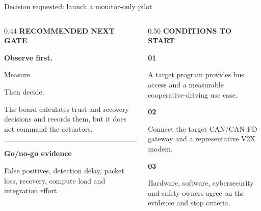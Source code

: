 \documentclass[aspectratio=169,11pt,xcolor=table]{beamer}
\newcommand{\eyebrow}[1]{%
  {\color{BrandCyan}\fontsize{7.5}{9}\selectfont\bfseries\MakeUppercase{#1}}\par\vspace{0.13cm}%
}
\newcommand{\stepnumber}[1]{%
  {\color{BrandCyan}\fontsize{17.5}{19.5}\selectfont\bfseries #1}%
}
\begin{document}
\begin{frame}{Decision requested: launch a monitor-only pilot}
  \begin{columns}[T,onlytextwidth]
    \begin{column}{0.44\textwidth}
      \eyebrow{Recommended next gate}
      {\color{BrandBlue}\fontsize{20}{22.5}\selectfont\bfseries Observe first.\par Measure.\par Then decide.}\par
      \vspace{0.18cm}
      {\fontsize{8.8}{10.6}\selectfont The board calculates trust and recovery decisions and records them, but it does not command the actuators.}\par
      \vspace{0.20cm}
      {\color{BrandMagenta}\rule{\linewidth}{0.09cm}}\par
      \vspace{0.11cm}
      {\color{BrandMagenta}\fontsize{9.2}{11}\selectfont\bfseries Go/no-go evidence}\par
      {\color{Muted}\fontsize{7.7}{9.2}\selectfont False positives, detection delay, packet loss, recovery, compute load and integration effort.}
    \end{column}
    \begin{column}{0.50\textwidth}
      \eyebrow{Conditions to start}
      \stepnumber{01}\par
      {\color{Muted}\fontsize{8.2}{9.8}\selectfont A target program provides bus access and a measurable cooperative-driving use case.}\par
      \vspace{0.15cm}
      \stepnumber{02}\par
      {\color{Muted}\fontsize{8.2}{9.8}\selectfont Connect the target CAN/CAN-FD gateway and a representative V2X modem.}\par
      \vspace{0.15cm}
      \stepnumber{03}\par
      {\color{Muted}\fontsize{8.2}{9.8}\selectfont Hardware, software, cybersecurity and safety owners agree on the evidence and stop criteria.}\par

\end{column}
\end{columns}
\end{frame}
\end{document}
